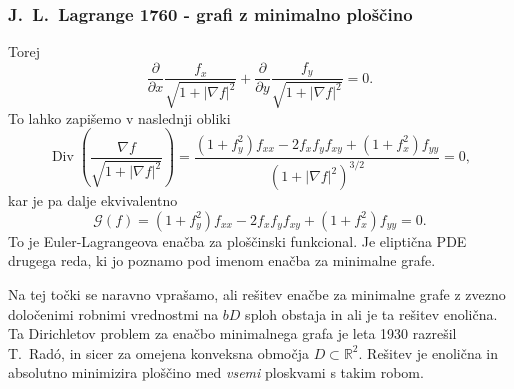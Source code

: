 \documentclass[8pt]{beamer}
\theoremstyle{definition}
\theoremstyle{remark}
\theoremstyle{plain}
\numberwithin{equation}{section}  %
\begin{document}
\begin{frame}
    \frametitle{J.~L.~Lagrange 1760 - grafi z minimalno ploščino}

    Torej
    \begin{equation*}
        \frac{\partial}{\partial x} \frac{f_x}{\sqrt{1+|\nabla f|^2}}+\frac{\partial}{\partial y} \frac{f_y}{\sqrt{1+|\nabla f|^2}}=0.
    \end{equation*}   
    To lahko zapišemo v naslednji obliki
    \begin{equation*}
        \operatorname{Div}\left(\frac{\nabla f}{\sqrt{1+|\nabla f|^2}}\right)=\frac{\left(1+f_y^2\right) f_{x x}-2 f_x f_y f_{x y}+\left(1+f_x^2\right) f_{y y}}{\left(1+|\nabla f|^2\right)^{3 / 2}}=0 , 
    \end{equation*}
    kar je pa dalje ekvivalentno
    \begin{equation*}
        \mathscr{G}(f)=\left(1+f_y^2\right) f_{x x}-2 f_x f_y f_{x y}+\left(1+f_x^2\right) f_{y y}=0 .
    \end{equation*}
    To je \textcolor{red1}{Euler-Lagrangeova enačba} za ploščinski funkcional. Je eliptična PDE drugega reda, ki jo poznamo pod imenom \textcolor{red1}{enačba za minimalne grafe}.
    
    \vspace{0.8em}
    
    Na tej točki se naravno vprašamo, ali rešitev enačbe za minimalne grafe z zvezno določenimi robnimi vrednostmi na $bD$ sploh obstaja in ali je ta rešitev enolična. Ta Dirichletov problem za enačbo minimalnega grafa je leta 1930 razrešil T.~Radó, in sicer za omejena konveksna območja $D \subset \mathbb{R}^2$. Rešitev je enolična in absolutno minimizira ploščino med \emph{vsemi} ploskvami s takim robom.

\end{frame}
\end{document}
